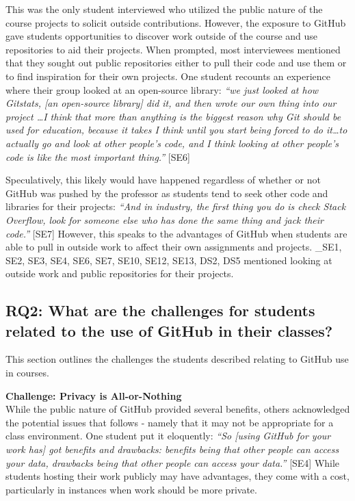 This was the only student interviewed who utilized the public nature of the course projects to solicit outside contributions. However, the exposure to GitHub gave students opportunities to discover work outside of the course and use repositories to aid their projects. When prompted, most interviewees mentioned that they sought out public repositories either to pull their code and use them or to find inspiration for their own projects. One student recounts an experience where their group looked at an open-source library: \textit{``we just looked at how Gitstats, [an open-source library] did it, and then wrote our own thing into our project \ldots I think that more than anything is the biggest reason why Git should be used for education, because it takes I think until you start being forced to do it\ldots to actually go and look at other people's code, and I think looking at other people's code is like the most important thing.''} [SE6]

Speculatively, this likely would have happened regardless of whether or not GitHub was pushed by the professor as students tend to seek other code and libraries for their projects: \textit{``And in industry, the first thing you do is check Stack Overflow, look for someone else who has done the same thing and jack their code.''} [SE7] However, this speaks to the advantages of GitHub when students are able to pull in outside work to affect their own assignments and projects. _{SE1, SE2, SE3, SE4, SE6, SE7, SE10, SE12, SE13, DS2, DS5} mentioned looking at outside work and public repositories for their projects.

\subsection{RQ2: What are the challenges for students related to the use of GitHub in their classes?}
This section outlines the challenges the students described relating to GitHub use in courses. 

\textbf{Challenge: Privacy is All-or-Nothing} \\
While the public nature of GitHub provided several benefits, others acknowledged the potential issues that follows - namely that it may not be appropriate for a class environment. One student put it eloquently: \textit{``So [using GitHub for your work has] got benefits and drawbacks: benefits being that other people can access your data, drawbacks being that other people can access your data.''} [SE4] While students hosting their work publicly may have advantages, they come with a cost, particularly in instances when work should be more private.

